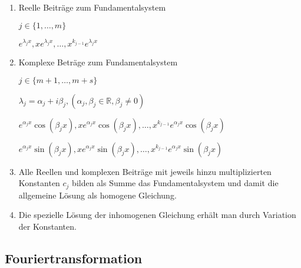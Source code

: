 \documentclass[]{article}
\begin{document}
\begin{enumerate}[1.]
\begin{enumerate}[]
						\end{enumerate}
						
					\item Reelle Beiträge zum Fundamentalsystem
					
						\begin{math}
							j \in \{ 1, \dots, m\}
						\end{math}
						
						\begin{math}
							e^{\lambda_j x}, x e^{\lambda_j x}, \dots, x^{k_{j-1}} e^{\lambda_j x}
						\end{math}
						
					\item Komplexe Beträge zum Fundamentalsystem
					
						\begin{math}
							j \in \{ m+1, \dots, m+s\}
						\end{math}
						
						\begin{math}
							\lambda_j = \alpha_j + i \beta_j, (\alpha_j, \beta_j \in \mathbb{R}, \beta_j \neq 0)
						\end{math}
						
						\begin{math}
							e^{\alpha_jx} \cos (\beta_jx), x e^{\alpha_jx} \cos (\beta_jx), \dots, x^{k_{j-1}} e^{\alpha_jx} \cos (\beta_jx)
						\end{math}
						
						\begin{math}
							e^{\alpha_jx} \sin (\beta_jx), x e^{\alpha_jx} \sin (\beta_jx), \dots, x^{k_{j-1}} e^{\alpha_jx} \sin (\beta_jx)
						\end{math}
						
					\item Alle Reellen und komplexen Beiträge mit jeweils hinzu multiplizierten Konstanten \begin{math} c_j \end{math} bilden als Summe das Fundamentalsystem und damit die allgemeine Lösung als homogene Gleichung.
					
					\item Die spezielle Lösung der inhomogenen Gleichung erhält man durch Variation der Konstanten.
				\end{enumerate}
				
			
				
		\subsection{Fouriertransformation}
			
\end{document}

